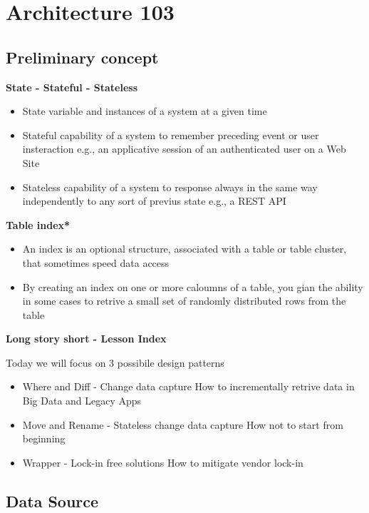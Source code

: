 \section{Architecture 103}

\subsection{Preliminary concept}

\textbf{State - Stateful - Stateless}

\begin{itemize}
	\item State
	variable and instances of a system at a given time
	\item Stateful
	capability of a system to remember preceding event or user insteraction
	e.g., an applicative session of an authenticated user on a Web Site
	\item Stateless
	capability of a system to response always in the same way independently to any sort of previus state
	e.g., a REST API
\end{itemize}

\textbf{Table index*}

\begin{itemize}
	\item An index is an optional structure, associated with a table or table cluster, that sometimes speed data access
	\item By creating an index on one or more caloumns of a table, you gian the ability in some cases to retrive a small set of randomly distributed rows from the table
\end{itemize}

\textbf{Long story short - Lesson Index}

Today we will focus on 3 possibile design patterns
\begin{itemize}
	\item Where and Diff - Change data capture
	How to incrementally retrive data in Big Data and Legacy Apps
	\item Move and Rename - Stateless change data capture
	How not to start from beginning
	\item Wrapper - Lock-in free solutions
	How to mitigate vendor lock-in
\end{itemize}

\subsection{Data Source}

